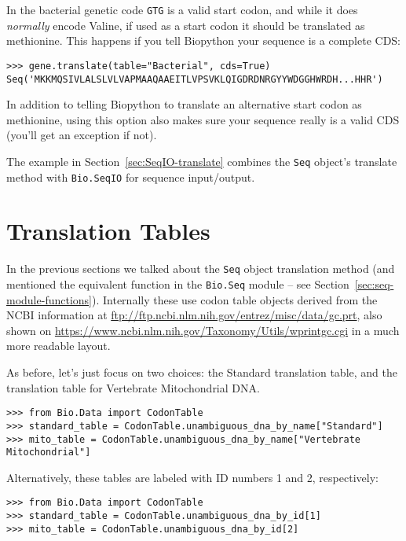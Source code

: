 \noindent In the bacterial genetic code \texttt{GTG} is a valid start codon,
and while it does \emph{normally} encode Valine, if used as a start codon it
should be translated as methionine. This happens if you tell Biopython your
sequence is a complete CDS:

\begin{verbatim}
>>> gene.translate(table="Bacterial", cds=True)
Seq('MKKMQSIVLALSLVLVAPMAAQAAEITLVPSVKLQIGDRDNRGYYWDGGHWRDH...HHR')
\end{verbatim}

In addition to telling Biopython to translate an alternative start codon as
methionine, using this option also makes sure your sequence really is a valid
CDS (you'll get an exception if not).

The example in Section~\ref{sec:SeqIO-translate} combines the \verb|Seq| object's
translate method with \verb|Bio.SeqIO| for sequence input/output.

\section{Translation Tables}

In the previous sections we talked about the \verb|Seq| object translation method (and mentioned the equivalent function in the \verb|Bio.Seq| module -- see
Section~\ref{sec:seq-module-functions}).
Internally these use codon table objects derived from the NCBI information at
\url{ftp://ftp.ncbi.nlm.nih.gov/entrez/misc/data/gc.prt}, also shown on
\url{https://www.ncbi.nlm.nih.gov/Taxonomy/Utils/wprintgc.cgi} in a much more readable layout.

As before, let's just focus on two choices: the Standard translation table, and the
translation table for Vertebrate Mitochondrial DNA.

\begin{verbatim}
>>> from Bio.Data import CodonTable
>>> standard_table = CodonTable.unambiguous_dna_by_name["Standard"]
>>> mito_table = CodonTable.unambiguous_dna_by_name["Vertebrate Mitochondrial"]
\end{verbatim}

Alternatively, these tables are labeled with ID numbers 1 and 2, respectively:

\begin{verbatim}
>>> from Bio.Data import CodonTable
>>> standard_table = CodonTable.unambiguous_dna_by_id[1]
>>> mito_table = CodonTable.unambiguous_dna_by_id[2]
\end{verbatim}

